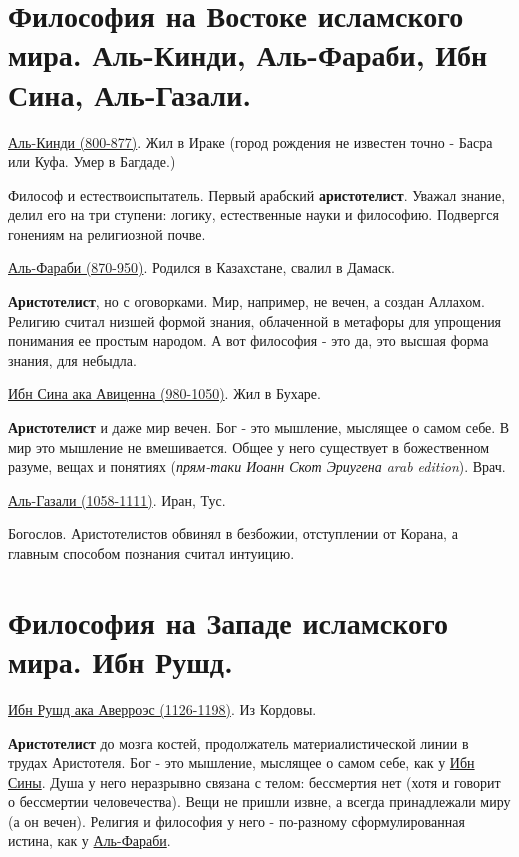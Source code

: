 \documentclass[12pt,a4paper]{article}
\begin{document}
\section{Философия на Востоке исламского мира. Аль-Кинди, Аль-Фараби, Ибн Сина, Аль-Газали.}
\hspace{8pt} 
\underline{Аль-Кинди (800-877)}. Жил в Ираке (город рождения не известен точно - Басра или Куфа. Умер в Багдаде.)

Философ и естествоиспытатель. Первый арабский \textbf{аристотелист}. Уважал знание, делил его на три ступени: логику, естественные науки и философию. Подвергся гонениям на религиозной почве.

\underline{Аль-Фараби (870-950)}. Родился в Казахстане, свалил в Дамаск.

\textbf{Аристотелист}, но с оговорками. Мир, например, не вечен, а создан Аллахом. Религию считал низшей формой знания, облаченной в метафоры для упрощения понимания ее простым народом. А вот философия - это да, это высшая форма знания, для небыдла.

\underline{Ибн Сина ака Авиценна (980-1050)}. Жил в Бухаре.


\textbf{Аристотелист} и даже мир вечен. Бог - это мышление, мыслящее о самом себе. В мир это мышление не вмешивается.
Общее у него существует в божественном разуме, вещах и понятиях (\textit{прям-таки Иоанн Скот Эриугена arab edition}). Врач.

\underline{Аль-Газали (1058-1111)}. Иран, Тус.

Богослов. Аристотелистов обвинял в безбожии, отступлении от Корана, а главным способом познания считал интуицию. 

\section{Философия на Западе исламского мира. Ибн Рушд.}
\hspace{8pt} 
\underline{Ибн Рушд ака Аверроэс (1126-1198)}. Из Кордовы.

\textbf{Аристотелист} до мозга костей, продолжатель материалистической линии в трудах Аристотеля. Бог - это мышление, мыслящее о самом себе, как у \underline{Ибн Сины}. Душа у него неразрывно связана с телом: бессмертия нет (хотя и говорит о бессмертии человечества). Вещи не пришли извне, а всегда принадлежали миру (а он вечен). Религия и философия у него - по-разному сформулированная истина, как у \underline{Аль-Фараби}.
\end{document}
